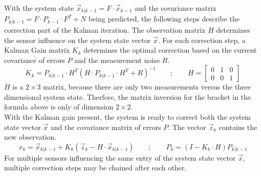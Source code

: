 With the system state $\vec{x}_{k|k-1}=F\cdot\vec{x}_{k-1}$ and the covariance matrix $P_{k|k-1}=F\cdot P_{k-1}\cdot F^{T}+N$ being predicted, the following steps describe the correction part of the Kalman iteration. The observation matrix $H$ determines the sensor influence on the system state vector $\vec{x}$. For each correction step, a Kalman Gain matrix $K_{k}$ determines the optimal correction based on the current covariance of errors $P$ and the measurement noise $R$.
\begin{equation*}
    K_{k} = P_{k|k-1}\cdot H^{T}(H\cdot P_{k|k-1}\cdot H^{T}+R)^{-1}
    \qquad ; \qquad
    H=
    \begin{bmatrix}
        0 & 1 & 0 \\
        0 & 0 & 1
    \end{bmatrix}
\end{equation*}
$H$ is a $2\times 3$ matrix, because there are only two measurements versus the three dimensional system state. Therfore, the matrix inversion for the bracket in the formula above is only of dimension $2\times 2$.\\
With the Kalman gain present, the system is ready to correct both the system state vector $\vec{x}$ and the covariance matrix of errors $P$. The vector $\vec{z}_{k}$ contains the new observation.
\begin{equation*}
    x_{k} = \vec{x}_{k|k-1}+K_{k}(\vec{z}_{k}-H\cdot \vec{x}_{k|k-1})
    \qquad ; \qquad
    P_{k}= (I-K_{k}\cdot H)P_{k|k-1}
\end{equation*}
For multiple sensors influencing the same entry of the system state vector $\vec{x}$, multiple correction steps may be chained after each other.